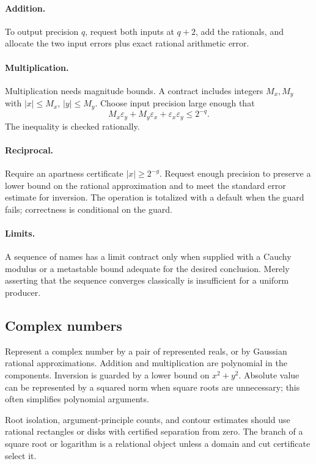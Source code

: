 \paragraph{Addition.}
To output precision \(q\), request both inputs at \(q+2\), add the rationals,
and allocate the two input errors plus exact rational arithmetic error.

\paragraph{Multiplication.}
Multiplication needs magnitude bounds.  A contract includes integers
\(M_x,M_y\) with \(|x|\le M_x\), \(|y|\le M_y\).  Choose input precision
large enough that
\[
    M_x\varepsilon_y+M_y\varepsilon_x+
    \varepsilon_x\varepsilon_y\le2^{-q}.
\]
The inequality is checked rationally.

\paragraph{Reciprocal.}
Require an apartness certificate \(|x|\ge2^{-g}\).  Request enough precision to
preserve a lower bound on the rational approximation and to meet the standard
error estimate for inversion.  The operation is totalized with a default when
the guard fails; correctness is conditional on the guard.

\paragraph{Limits.}
A sequence of names has a limit contract only when supplied with a Cauchy
modulus or a metastable bound adequate for the desired conclusion.  Merely
asserting that the sequence converges classically is insufficient for a
uniform producer.

\subsection{Complex numbers}

Represent a complex number by a pair of represented reals, or by Gaussian
rational approximations.  Addition and multiplication are polynomial in the
components.  Inversion is guarded by a lower bound on
\(x^2+y^2\).  Absolute value can be represented by a squared norm when square
roots are unnecessary; this often simplifies polynomial arguments.

Root isolation, argument-principle counts, and contour estimates should use
rational rectangles or disks with certified separation from zero.  The branch
of a square root or logarithm is a relational object unless a domain and cut
certificate select it.

